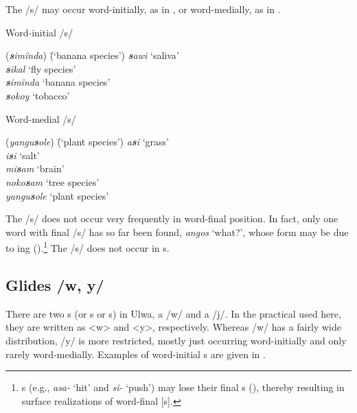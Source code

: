 The    /s/ may occur word-initially, as in , or word-medially, as in .

\ea%
    \label{ex:phon:35}
          Word-initial /s/\\
\begin{tabbing}
{(\textit{\textbf{s}imïnda})} \= {(‘banana species’)}\kill
{\textit{\textbf{s}awi}} \> {‘saliva’}\\
{\textit{\textbf{s}ikal}} \> {‘fly species’}\\
{\textit{\textbf{s}imïnda}} \> {‘banana species’}\\
{\textit{\textbf{s}okoy}} \> {‘tobacco’}
\end{tabbing}
\z

\ea%
    \label{ex:phon:36}
          Word-medial /s/\\
\begin{tabbing}
{(\textit{yangu\textbf{s}ole})} \= {(‘plant species’)}\kill
{\textit{a\textbf{s}i}} \> {‘grass’}\\
{\textit{i\textbf{s}i}} \> {‘salt’}\\
{\textit{mi\textbf{s}am}} \> {‘brain’}\\
{\textit{noko\textbf{s}am}} \> {‘tree species’}\\
{\textit{yangu\textbf{s}ole}} \> {‘plant species’}
\end{tabbing}
\z

The  /s/ does not occur very frequently in word-final position. In fact, only one word with final /s/ has so far been found, \textit{angos} ‘what?’, whose form may be due to ing ().\footnote{s (e.g., \textit{asa-} ‘hit’ and \textit{si-} ‘push’) may lose their final s (), thereby resulting in surface realizations of word-final [s].} The  /s/ does not occur in s.


\subsection{Glides /w, y/}\label{sec:2.1.7}


There are two s (or s or s) in Ulwa, a  /w/ and a  /j/. In the practical  used here, they are written as <w> and <y>, respectively. Whereas /w/ has a fairly wide distribution, /y/ is more restricted, mostly just occurring word-initially and only rarely word-medially. Examples of word-initial s are given in .

